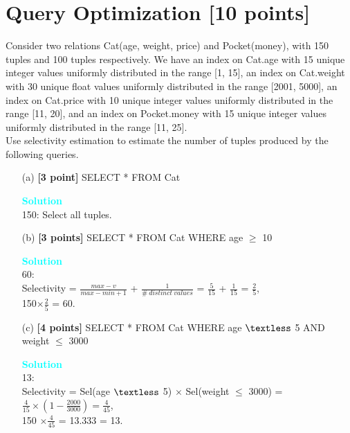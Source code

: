 \documentclass[10pt]{article}
\newenvironment{solution}
    { \begin{mdframed}[backgroundcolor=gray!10] \textcolor{cyan}{\textbf{Solution}} \\}
    {  \end{mdframed}}
\begin{document}
\newpage
\section{Query Optimization \textbf{[10 points]}}
Consider two relations Cat(age, weight, price) and Pocket(money), with 150 tuples and 100 tuples respectively.
We have an index on Cat.age with 15 unique integer values uniformly distributed in the range [1, 15],
an index on Cat.weight with 30 unique float values uniformly distributed in the range [2001, 5000],
an index on Cat.price with 10 unique integer values uniformly distributed in the range [11, 20],
and an index on Pocket.money with 15 unique integer values uniformly distributed in the range [11, 25]. \\
Use selectivity estimation to estimate the number of tuples produced by the following queries.
\begin{itemize}
	\item[(a)] \textbf{[3 point]} SELECT * FROM Cat\\
		      \begin{solution}
		      150: Select all tuples.
	      \end{solution} 
	\item[(b)] \textbf{[3 points]} SELECT * FROM Cat WHERE age $\geq$ 10\\
	      \begin{solution}
		      60: \\
		      Selectivity = $\frac{max - v}{max - min + 1}$ + $\frac{1}{\#\  distinct\ values}$ = $\frac{5}{15}$ + $\frac{1}{15}$ = $\frac{2}{5}$, \\
		      150$\times \frac{2}{5}$ = 60.
	      \end{solution}
	\item[(c)] \textbf{[4 points]} SELECT * FROM Cat WHERE age $\textless$ 5 AND weight $\leq$ 3000\\
	 \begin{solution}
		      13: \\
		      Selectivity = Sel(age $\textless$ 5) $\times$ Sel(weight $\leq$ 3000) = $\frac{4}{15} \times \left( 1- \frac{2000}{3000} \right) = \frac{4}{45}$, \\
		      150 $\times \frac{4}{45}$ = 13.333 = 13.
	      \end{solution} 
\end{itemize}
\end{document}
